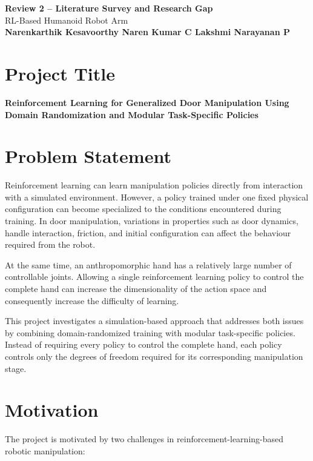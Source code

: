 \documentclass[12pt,a4paper]{report}
\begin{document}
\begin{center}
    {\LARGE \textbf{Review 2 -- Literature Survey and Research Gap}}\\[0.5em]
    {\large RL-Based Humanoid Robot Arm}\\[0.5em]
    \textbf{Narenkarthik Kesavoorthy \quad Naren Kumar C \quad Lakshmi Narayanan P}
\end{center}

\section{Project Title}

\textbf{Reinforcement Learning for Generalized Door Manipulation Using Domain Randomization and Modular Task-Specific Policies}

\section{Problem Statement}

Reinforcement learning can learn manipulation policies directly from interaction with a simulated environment. However, a policy trained under one fixed physical configuration can become specialized to the conditions encountered during training. In door manipulation, variations in properties such as door dynamics, handle interaction, friction, and initial configuration can affect the behaviour required from the robot.

At the same time, an anthropomorphic hand has a relatively large number of controllable joints. Allowing a single reinforcement learning policy to control the complete hand can increase the dimensionality of the action space and consequently increase the difficulty of learning.

This project investigates a simulation-based approach that addresses both issues by combining domain-randomized training with modular task-specific policies. Instead of requiring every policy to control the complete hand, each policy controls only the degrees of freedom required for its corresponding manipulation stage.

\section{Motivation}

The project is motivated by two challenges in reinforcement-learning-based robotic manipulation:
\end{document}
